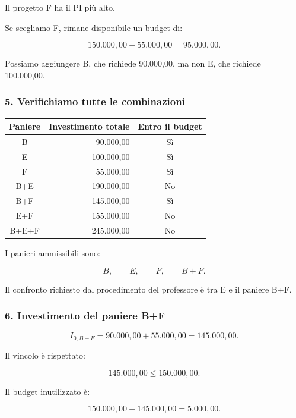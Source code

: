 \noindent Il progetto F ha il PI più alto.

\noindent Se scegliamo F,
rimane disponibile un budget di:

\[
150.000{,}00-55.000{,}00
=
95.000{,}00.
\]

\noindent Possiamo aggiungere B,
che richiede 90.000,00,
ma non E,
che richiede 100.000,00.


\subsubsection*{5. Verifichiamo tutte le combinazioni}

\begin{center}
    \small
    \begin{tabular}{|c|r|c|}
        \hline
        \textbf{Paniere}
        & \textbf{Investimento totale}
        & \textbf{Entro il budget} \\
        \hline
        B & 90.000,00 & Sì \\
        E & 100.000,00 & Sì \\
        F & 55.000,00 & Sì \\
        B+E & 190.000,00 & No \\
        B+F & 145.000,00 & Sì \\
        E+F & 155.000,00 & No \\
        B+E+F & 245.000,00 & No \\
        \hline
    \end{tabular}
\end{center}

\noindent I panieri ammissibili sono:

\[
B,\qquad E,\qquad F,\qquad B+F.
\]

\noindent Il confronto richiesto
dal procedimento del professore
è tra E e il paniere B+F.


\subsubsection*{6. Investimento del paniere B+F}

\[
I_{0,B+F}
=
90.000{,}00+55.000{,}00
=
\boxed{145.000{,}00}.
\]

\noindent Il vincolo è rispettato:

\[
145.000{,}00\leq150.000{,}00.
\]

\noindent Il budget inutilizzato è:

\[
150.000{,}00-145.000{,}00
=
\boxed{5.000{,}00}.
\]


